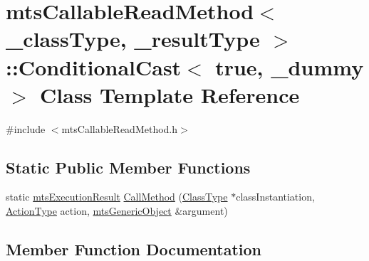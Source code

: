\hypertarget{classmts_callable_read_method_1_1_conditional_cast_3_01true_00_01__dummy_01_4}{}\section{mts\+Callable\+Read\+Method$<$ \+\_\+class\+Type, \+\_\+result\+Type $>$\+:\+:Conditional\+Cast$<$ true, \+\_\+dummy $>$ Class Template Reference}
\label{classmts_callable_read_method_1_1_conditional_cast_3_01true_00_01__dummy_01_4}


{\ttfamily \#include $<$mts\+Callable\+Read\+Method.\+h$>$}

\subsection*{Static Public Member Functions}
\begin{DoxyCompactItemize}
\item 
static \hyperlink{classmts_execution_result}{mts\+Execution\+Result} \hyperlink{classmts_callable_read_method_1_1_conditional_cast_3_01true_00_01__dummy_01_4_a8b9d29573fa000d56b43efd541744ca9}{Call\+Method} (\hyperlink{classmts_callable_read_method_a44650138085a29d60a4f3cb3616abbbf}{Class\+Type} $\ast$class\+Instantiation, \hyperlink{classmts_callable_read_method_a9e05546d6f486e77f1df0c2b079dd7e1}{Action\+Type} action, \hyperlink{classmts_generic_object}{mts\+Generic\+Object} \&argument)
\end{DoxyCompactItemize}


\subsection{Member Function Documentation}
\hypertarget{classmts_callable_read_method_1_1_conditional_cast_3_01true_00_01__dummy_01_4_a8b9d29573fa000d56b43efd541744ca9}{}

